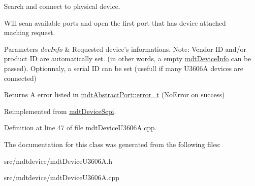 Search and connect to physical device. 

Will scan available ports and open the first port that has device attached maching request.


\begin{DoxyParams}{Parameters}
{\em devInfo} & Requested device's informations. Note: Vendor ID and/or product ID are automatically set. (in other words, a empty \hyperlink{classmdt_device_info}{mdtDeviceInfo} can be passed). Optionnaly, a serial ID can be set (usefull if many U3606A devices are connected) \\
\hline
\end{DoxyParams}
\begin{DoxyReturn}{Returns}
A error listed in \hyperlink{classmdt_abstract_port_ad4121bb930c95887e77f8bafa065a85e}{mdtAbstractPort::error\_\-t} (NoError on success) 
\end{DoxyReturn}


Reimplemented from \hyperlink{classmdt_device_scpi_ae8e886b362cbf9d1bf7064b48348b8e8}{mdtDeviceScpi}.



Definition at line 47 of file mdtDeviceU3606A.cpp.



The documentation for this class was generated from the following files:\begin{DoxyCompactItemize}
\item 
src/mdtdevice/mdtDeviceU3606A.h\item 
src/mdtdevice/mdtDeviceU3606A.cpp\end{DoxyCompactItemize}
